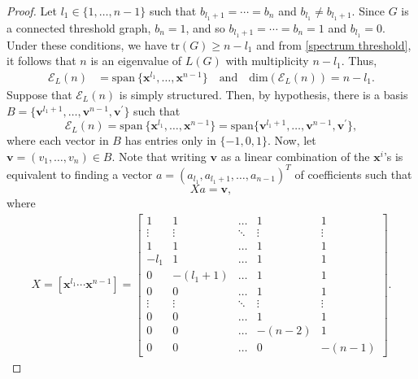 \documentclass[preprint]{elsarticle}
\begin{document}
\begin{proof}
Let $l_1 \in \{1,\ldots,n-1\}$ such that $b_{l_1+1}=\cdots=b_n$ and $b_{l_1}\neq b_{l_1+1}$. Since $G$ is a connected threshold graph, $b_n=1$, and so $b_{l_1+1}=\cdots=b_n=1$ and $b_{l_1}=0$. Under these conditions, we have $\text{tr}(G)\geq n-l_1$ and from \eqref{spectrum  threshold}, it follows that $n$ is an eigenvalue of $L(G)$ with multiplicity $n-l_1$. Thus,
\begin{align*}
    \mathcal{E}_L(n)&=\mathrm{span} \ \{ \mathbf{x}^{l_1}, \ldots, \mathbf{x}^{n-1} \} \quad  \textrm{and} \quad \mathrm{dim}(\mathcal{E}_{L}(n)) = n-l_1.
\end{align*} 
Suppose that $\mathcal{E}_L(n)$ is simply structured. Then, by hypothesis, there is a basis $B=\{\mathbf{v}^{l_1+1}, \ldots, \mathbf{v}^{n-1}, \mathbf{v}^{\prime}\}$ such that 
$$\mathcal{E}_L(n)=\mathrm{span} \ \{ \mathbf{x}^{l_1}, \ldots, \mathbf{x}^{n-1} \} = \mathrm{span}\{\mathbf{v}^{l_1+1}, \ldots, \mathbf{v}^{n-1},\mathbf{v}^{\prime}\},$$
where each vector in $B$ has entries only in $\{-1,0,1\}$.
Now, let $\mathbf{v}=(v_{1}, \ldots, v_{n}) \in B$. Note that writing $\mathbf{v}$ as a linear combination of the $\mathbf{x}^{i}$'s is equivalent to finding a vector $a=(a_{l_1}, a_{l_1+1}, \ldots, a_{n-1})^{T}$ of coefficients such that 
\begin{equation}\label{eq:sistemalinear(n)}
    X a = \mathbf{v},
\end{equation}
where 
\begin{align*}
    X=[\mathbf{x}^{l_1}\cdots\mathbf{x}^{n-1}]=\left[\begin{array}{ccccc}
        1          & 1          & \ldots     & 1          & 1 \\ 
        \vdots     & \vdots     & \ddots     & \vdots     & \vdots \\ 
        1          & 1          & \ldots     & 1          & 1 \\
        -l_1         & 1          & \ldots     & 1          & 1 \\ 
        0          & -(l_1+1)     & \ldots     & 1          & 1 \\ 
        0          & 0          & \ldots     & 1          & 1 \\
        \vdots     & \vdots     & \ddots     & \vdots     & \vdots \\ 
        0          & 0          & \ldots     & 1          & 1 \\ 
        0          & 0          & \ldots     & -(n-2)     & 1 \\ 
        0          & 0          & \ldots     & 0          & -(n-1) 
    \end{array}\right].
\end{align*}
 

\end{proof}
\end{document}
